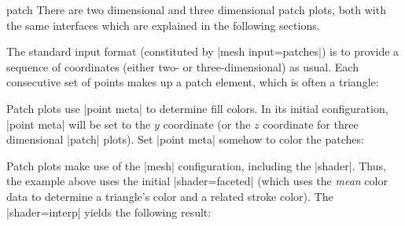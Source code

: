 {\begin{plottype}[/pgfplots]{patch}
    There are two dimensional and three dimensional patch plots, both with the
    same interfaces which are explained in the following sections.

    The standard input format (constituted by |mesh input=patches|) is to
    provide a sequence of coordinates (either two- or three-dimensional) as
    usual. Each consecutive set of points makes up a patch element, which is
    often a triangle:
\begin{codeexample}[]
\end{codeexample}
    \noindent Patch plots use |point meta| to determine fill colors. In its
    initial configuration, |point meta| will be set to the $y$ coordinate (or
    the $z$ coordinate for three dimensional |patch| plots). Set |point meta|
    somehow to color the patches:
\begin{codeexample}[]
\end{codeexample}
    Patch plots make use of the |mesh| configuration, including the |shader|.
    Thus, the example above uses the initial |shader=faceted| (which uses the
    \emph{mean} color data to determine a triangle's color and a related stroke
    color). The |shader=interp| yields the following result:
\begin{codeexample}[]
\end{codeexample}
\end{plottype}}
